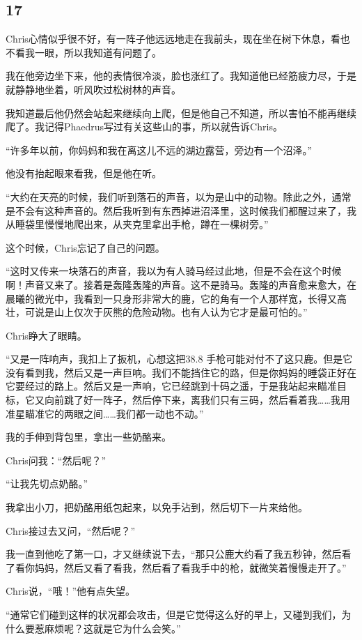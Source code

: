 \documentclass[UTF8]{article}
\begin{document}
\subsection*{17}
\par Chris心情似乎很不好，有一阵子他远远地走在我前头，现在坐在树下休息，看也不看我一眼，所以我知道有问题了。
\par 我在他旁边坐下来，他的表情很冷淡，脸也涨红了。我知道他已经筋疲力尽，于是就静静地坐着，听风吹过松树林的声音。
\par 我知道最后他仍然会站起来继续向上爬，但是他自己不知道，所以害怕不能再继续爬了。我记得Phaedrus写过有关这些山的事，所以就告诉Chris。
\par “许多年以前，你妈妈和我在离这儿不远的湖边露营，旁边有一个沼泽。”
\par 他没有抬起眼来看我，但是他在听。
\par “大约在天亮的时候，我们听到落石的声音，以为是山中的动物。除此之外，通常是不会有这种声音的。然后我听到有东西掉进沼泽里，这时候我们都醒过来了，我从睡袋里慢慢地爬出来，从夹克里拿出手枪，蹲在一棵树旁。”
\par 这个时候，Chris忘记了自己的问题。
\par “这时又传来一块落石的声音，我以为有人骑马经过此地，但是不会在这个时候啊！声音又来了。接着是轰隆轰隆的声音。这不是骑马。轰隆的声音愈来愈大，在晨曦的微光中，我看到一只身形非常大的鹿，它的角有一个人那样宽，长得又高壮，可说是山上仅次于灰熊的危险动物。也有人认为它才是最可怕的。”
\par Chris睁大了眼睛。
\par “又是一阵响声，我扣上了扳机，心想这把38.8 手枪可能对付不了这只鹿。但是它没有看到我，然后又是一声巨响。我们不能挡住它的路，但是你妈妈的睡袋正好在它要经过的路上。然后又是一声响，它已经跳到十码之遥，于是我站起来瞄准目标，它又向前跳了好一阵子，然后停下来，离我们只有三码，然后看着我……我用准星瞄准它的两眼之间……我们都一动也不动。”
\par 我的手伸到背包里，拿出一些奶酪来。
\par Chris问我：“然后呢？”
\par “让我先切点奶酪。”
\par 我拿出小刀，把奶酪用纸包起来，以免手沾到，然后切下一片来给他。
\par Chris接过去又问，“然后呢？”
\par 我一直到他吃了第一口，才又继续说下去，“那只公鹿大约看了我五秒钟，然后看了看你妈妈，然后又看了看我，然后看了看我手中的枪，就微笑着慢慢走开了。”
\par Chris说，“哦！”他有点失望。
\par “通常它们碰到这样的状况都会攻击，但是它觉得这么好的早上，又碰到我们，为什么要惹麻烦呢？这就是它为什么会笑。”
\end{document}
